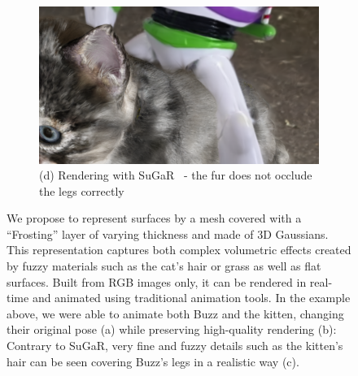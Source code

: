 \begin{figure}[ht]
\begin{subfigure}{0.49\linewidth}
 \includegraphics[width=0.49\linewidth]{images/composition/buzz_riding_cat/closeup_2_flat.png}
  \caption*{(d) Rendering with SuGaR~\cite{guedon2023sugar} - the fur does not occlude the legs correctly}
  \end{subfigure}
  \caption{
  We propose to represent surfaces by a mesh covered with a ``Frosting'' layer of varying thickness and made of 3D Gaussians. This representation captures both complex volumetric effects created by fuzzy materials such as the cat's hair or grass as well as flat surfaces. 
  Built from RGB images only, it can be rendered in real-time and animated using traditional animation tools.
  In the example above, we were able to animate both Buzz and the kitten, changing their original pose (a) while preserving high-quality rendering (b): Contrary to SuGaR, very fine and fuzzy details such as the kitten's hair can be seen covering Buzz's legs in a realistic way (c).
  }
  \label{fig:sugar-comparison}
\end{figure}